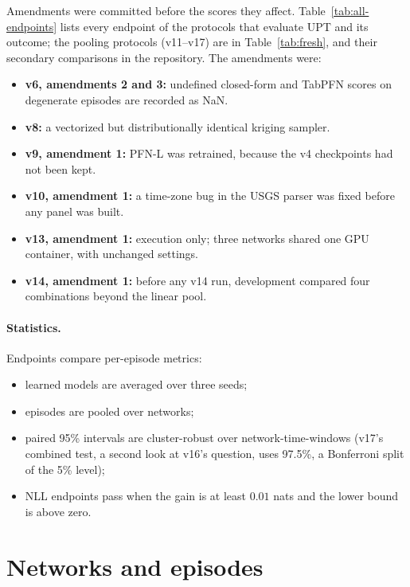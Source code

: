 Amendments were committed before the scores they affect. Table~\ref{tab:all-endpoints} lists every endpoint of the
protocols that evaluate UPT and its outcome; the pooling protocols (v11--v17) are in Table~\ref{tab:fresh}, and their
secondary comparisons in the repository. The amendments were:
\begin{itemize}
  \item \textbf{v6, amendments 2 and 3:} undefined closed-form and TabPFN scores on degenerate episodes are recorded as NaN.
  \item \textbf{v8:} a vectorized but distributionally identical kriging sampler.
  \item \textbf{v9, amendment 1:} PFN-L was retrained, because the v4 checkpoints had not been kept.
  \item \textbf{v10, amendment 1:} a time-zone bug in the USGS parser was fixed before any panel was built.
  \item \textbf{v13, amendment 1:} execution only; three networks shared one GPU container, with unchanged settings.
  \item \textbf{v14, amendment 1:} before any v14 run, development compared four combinations beyond the linear pool.
\end{itemize}

\paragraph{Statistics.} Endpoints compare per-episode metrics:
\begin{itemize}
  \item learned models are averaged over three seeds;
  \item episodes are pooled over networks;
  \item paired 95\% intervals are cluster-robust over network-time-windows (v17's combined test, a second look at
  v16's question, uses 97.5\%, a Bonferroni split of the 5\% level);
  \item NLL endpoints pass when the gain is at least $0.01$ nats and the lower bound is above zero.
\end{itemize}



\section{Networks and episodes}
\label{app:data}



